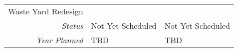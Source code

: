 \begin{tabularx}{\textwidth}{r|X|X|}
\multicolumn{1}{|V{.2\columnwidth}|}{\cellcolor{ccorangelight}Waste Yard Redesign}          &                                                                  &                                                                  \\
    \multicolumn{1}{|r|}{\cellcolor{ccorangelight}\textit{Status}}                & Not Yet Scheduled                                                         & Not Yet Scheduled                                                         \\
    \multicolumn{1}{|r|}{\cellcolor{ccorangelight}\textit{Year Planned}}                  & TBD                                                     & TBD                                                     \\ \hline
\end{tabularx}